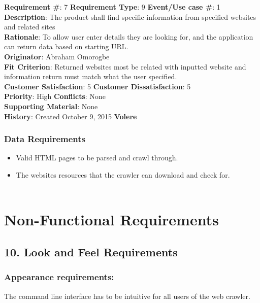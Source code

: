 \documentclass[titlepage]{article}
\begin{document}
\begin{framed}
\textbf{Requirement \#}: 7 \hfill \textbf{Requirement Type}: 9 \hfill\textbf{Event/Use case \#}: 1 \hfill\\
\textbf{Description}:  The product shall find specific information from specified websites and related sites\\
\textbf{Rationale}: To allow user enter details they are looking for, and the application can return data based on starting URL.\\
\textbf{Originator}: Abraham Omorogbe\\
\textbf{Fit Criterion}: Returned websites most be related with inputted website and information return must match what the user specified.\\
\textbf{Customer Satisfaction}: 5 \hfill 	\textbf{Customer Dissatisfaction}: 5 \hfill\\
\textbf{Priority}: High \hfill \textbf{Conflicts}: None \hfill 		\\
\textbf{Supporting Material}: None\\
\textbf{History}: Created October 9, 2015 \hfill	 \textbf{Volere}\hfill

\end{framed}

\subsubsection*{Data Requirements}
\begin{itemize}
  \item Valid HTML pages to be parsed and crawl through.
  \item The websites resources that the crawler can download and check for. \\ \\
\end{itemize}


\section{Non-Functional Requirements}

\subsection{10. Look and Feel Requirements}

\subsubsection*{Appearance requirements:}  The command line interface has to be intuitive for all users of the web crawler.
\end{document}
